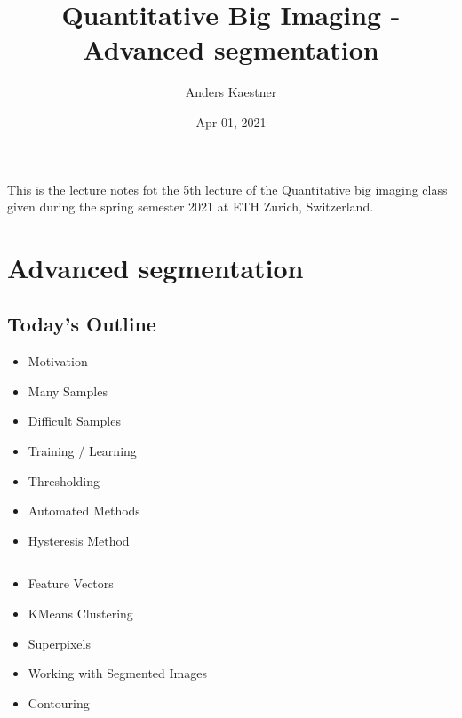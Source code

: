 \documentclass[letterpaper,10pt,english]{sphinxmanual}
\title{Quantitative Big Imaging - Advanced segmentation}
\date{Apr 01, 2021}
\author{Anders Kaestner}
\begin{document}
\pagestyle{empty}
\sphinxmaketitle
\pagestyle{plain}
\sphinxtableofcontents
\pagestyle{normal}
\label{\detokenize{preface::doc}}


\sphinxAtStartPar
This is the lecture notes fot the 5th lecture of the Quantitative big imaging class given during the spring semester 2021 at ETH Zurich, Switzerland.


\chapter{Advanced segmentation}
\label{\detokenize{05-AdvancedSegmentation:advanced-segmentation}}\label{\detokenize{05-AdvancedSegmentation::doc}}



\section{Today’s Outline}
\label{\detokenize{05-AdvancedSegmentation:today-s-outline}}\begin{itemize}
\item {} 
\sphinxAtStartPar
Motivation

\item {} 
\sphinxAtStartPar
Many Samples

\item {} 
\sphinxAtStartPar
Difficult Samples

\item {} 
\sphinxAtStartPar
Training / Learning

\item {} 
\sphinxAtStartPar
Thresholding

\item {} 
\sphinxAtStartPar
Automated Methods

\item {} 
\sphinxAtStartPar
Hysteresis Method

\end{itemize}


\bigskip\hrule\bigskip

\begin{itemize}
\item {} 
\sphinxAtStartPar
Feature Vectors

\item {} 
\sphinxAtStartPar
K\sphinxhyphen{}Means Clustering

\item {} 
\sphinxAtStartPar
Superpixels

\item {} 
\sphinxAtStartPar
Working with Segmented Images

\item {} 
\sphinxAtStartPar
Contouring

\end{itemize}
\end{document}
